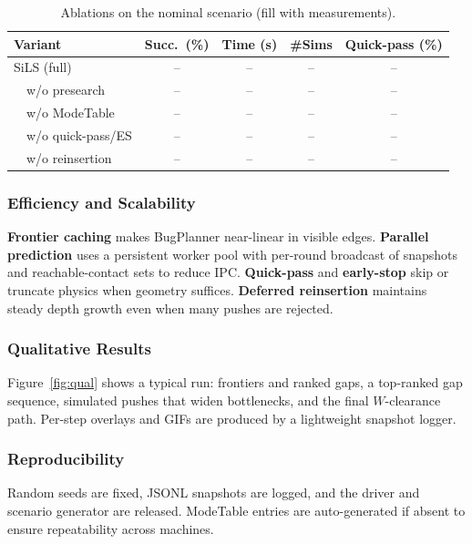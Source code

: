 \begin{table}[t]
  \centering
  \caption{Ablations on the nominal scenario (fill with measurements).}
  \label{tab:ablation}
  \vspace{2pt}
  
  {%
  \setlength{\tabcolsep}{3pt} %
  \renewcommand{\arraystretch}{0.9} %
  
  \begin{tabular}{lcccc}
  \toprule
  Variant & Succ.~(\%) & Time (s) & \#Sims & Quick-pass (\%) \\
  \midrule
  SiLS (full)            & -- & -- & -- & -- \\
  \ \ w/o presearch      & -- & -- & -- & -- \\
  \ \ w/o ModeTable      & -- & -- & -- & -- \\
  \ \ w/o quick-pass/ES  & -- & -- & -- & -- \\
  \ \ w/o reinsertion    & -- & -- & -- & -- \\
  \bottomrule
  \end{tabular}
  }%
  
  \end{table}
  

\subsubsection{Efficiency and Scalability}
\label{subsec:eff}
\textbf{Frontier caching} makes BugPlanner near-linear in visible edges.
\textbf{Parallel prediction} uses a persistent worker pool with per-round
broadcast of snapshots and reachable-contact sets to reduce IPC.
\textbf{Quick-pass} and \textbf{early-stop} skip or truncate physics when
geometry suffices. \textbf{Deferred reinsertion} maintains steady depth
growth even when many pushes are rejected.

\subsubsection{Qualitative Results}
\label{subsec:qual}
Figure~\ref{fig:qual} shows a typical run: frontiers and ranked gaps,
a top-ranked gap sequence, simulated pushes that widen bottlenecks, and
the final $W$-clearance path. Per-step overlays and GIFs are produced by
a lightweight snapshot logger.


\subsubsection{Reproducibility}
\label{subsec:repro}
Random seeds are fixed, JSONL snapshots are logged, and the driver and
scenario generator are released. ModeTable entries are auto-generated if
absent to ensure repeatability across machines.

